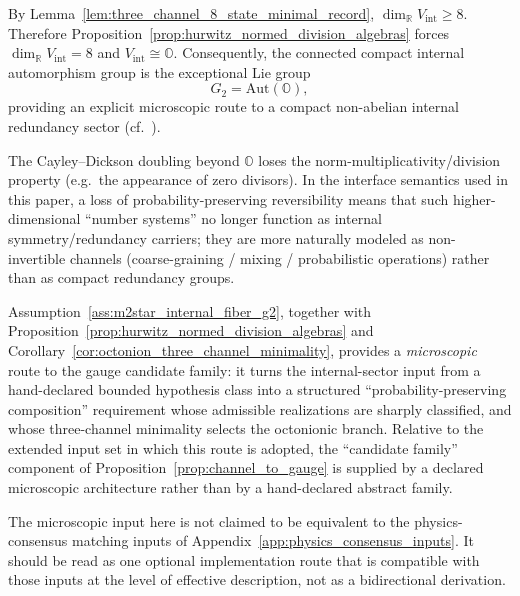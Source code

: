 \begin{corollary}
\label{cor:octonion_three_channel_minimality}
By Lemma~\ref{lem:three_channel_8_state_minimal_record}, $\dim_{\mathbb{R}} V_{\mathrm{int}}\ge 8$.
Therefore Proposition~\ref{prop:hurwitz_normed_division_algebras} forces $\dim_{\mathbb{R}} V_{\mathrm{int}}=8$ and $V_{\mathrm{int}}\cong \mathbb{O}$.
Consequently, the connected compact internal automorphism group is the exceptional Lie group
\[
G_2=\mathrm{Aut}(\mathbb{O}),
\]
providing an explicit microscopic route to a compact non-abelian internal redundancy sector (cf.\ \cite{Baez2002,SpringerVeldkamp2000}).
\end{corollary}

\begin{remark}
\AuditTag The Cayley--Dickson doubling beyond $\mathbb{O}$ loses the norm-multiplicativity/division property (e.g.\ the appearance of zero divisors).
In the interface semantics used in this paper, a loss of probability-preserving reversibility means that such higher-dimensional ``number systems'' no longer function as internal symmetry/redundancy carriers; they are more naturally modeled as non-invertible channels (coarse-graining / mixing / probabilistic operations) rather than as compact redundancy groups.
\end{remark}

\begin{remark}
\AuditTag Assumption~\ref{ass:m2star_internal_fiber_g2}, together with Proposition~\ref{prop:hurwitz_normed_division_algebras} and Corollary~\ref{cor:octonion_three_channel_minimality}, provides a \emph{microscopic} route to the gauge candidate family: it turns the internal-sector input from a hand-declared bounded hypothesis class into a structured ``probability-preserving composition'' requirement whose admissible realizations are sharply classified, and whose three-channel minimality selects the octonionic branch.
Relative to the extended input set in which this route is adopted, the ``candidate family'' component of Proposition~\ref{prop:channel_to_gauge} is supplied by a declared microscopic architecture rather than by a hand-declared abstract family.
\end{remark}

\begin{remark}
\AuditTag The microscopic input here is not claimed to be equivalent to the physics-consensus matching inputs of Appendix~\ref{app:physics_consensus_inputs}.
It should be read as one optional implementation route that is compatible with those inputs at the level of effective description, not as a bidirectional derivation.
\end{remark}


